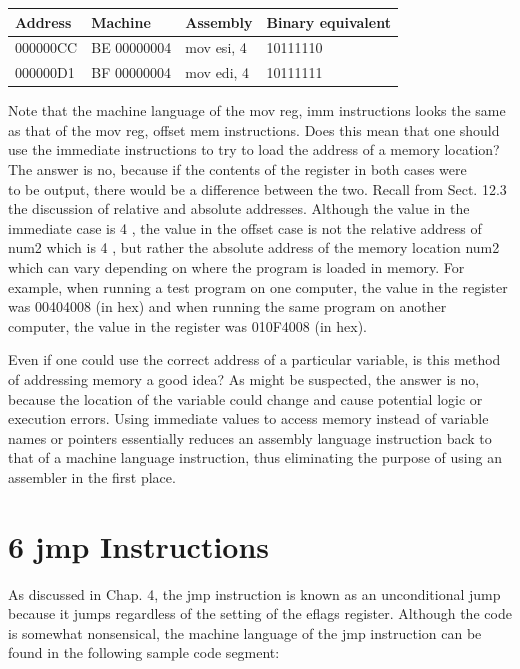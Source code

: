 \documentclass[10pt]{article}
\begin{document}
\begin{center}
\begin{tabular}{|l|l|l|l|}
\hline
Address & Machine & Assembly & Binary equivalent \\
\hline
000000CC & BE 00000004 & mov esi, 4 & 10111110 \\
\hline
000000D1 & BF 00000004 & mov edi, 4 & 10111111 \\
\hline
\end{tabular}
\end{center}

Note that the machine language of the mov reg, imm instructions looks the same as that of the mov reg, offset mem instructions. Does this mean that one should use the immediate instructions to try to load the address of a memory location? The answer is no, because if the contents of the register in both cases were\\
to be output, there would be a difference between the two. Recall from Sect. 12.3 the discussion of relative and absolute addresses. Although the value in the immediate case is 4 , the value in the offset case is not the relative address of num2 which is 4 , but rather the absolute address of the memory location num2 which can vary depending on where the program is loaded in memory. For example, when running a test program on one computer, the value in the register was 00404008 (in hex) and when running the same program on another computer, the value in the register was 010F4008 (in hex).

Even if one could use the correct address of a particular variable, is this method of addressing memory a good idea? As might be suspected, the answer is no, because the location of the variable could change and cause potential logic or execution errors. Using immediate values to access memory instead of variable names or pointers essentially reduces an assembly language instruction back to that of a machine language instruction, thus eliminating the purpose of using an assembler in the first place.

\section*{6 jmp Instructions}
As discussed in Chap. 4, the jmp instruction is known as an unconditional jump because it jumps regardless of the setting of the eflags register. Although the code is somewhat nonsensical, the machine language of the jmp instruction can be found in the following sample code segment:
\end{document}
